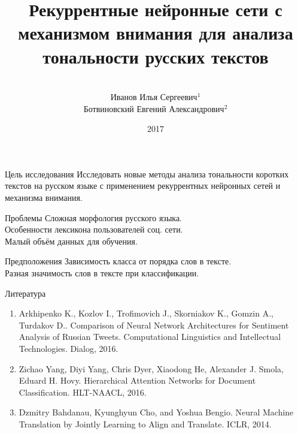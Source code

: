 \documentclass{beamer}
\title[\hbox to 56mm{\hfill\insertframenumber\,/\,\inserttotalframenumber}]
{Рекуррентные нейронные сети с механизмом внимания для анализа тональности русских текстов}
\author[И.\,С. Иванов]{\large \\Иванов Илья Сергеевич$^{1}$
{\large \\Ботвиновский Евгений Александрович$^{2}$}}
\institute{
$^{1}$студент, Московский Физико-Технический Институт\\
$^{2}$к.ф.-м.н., DeepHackLab\\
}
\date{2017}
\begin{document}
\nocite{*}
\begin{frame}
\titlepage
\end{frame}
\begin{frame}{Цель исследования}
Исследовать новые методы анализа тональности коротких текстов на русском языке с применением рекуррентных нейронных сетей и механизма внимания.
\begin{block}{Проблемы}
	Сложная морфология русского языка.\\
	Особенности лексикона пользователей соц. сети.\\
	Малый объём данных для обучения.\\
\end{block}

\begin{block}{Предположения}
	Зависимость класса от порядка слов в тексте.\\
	Разная значимость слов в тексте при классификации.
\end{block}

\end{frame}
\begin{frame}{Литература}
	\begin{enumerate}
		\item Arkhipenko K., Kozlov I., Trofimovich J., Skorniakov K., Gomzin A., Turdakov D.. Comparison of Neural Network Architectures for Sentiment Analysis of Russian Tweets. Computational Linguistics and Intellectual Technologies. Dialog, 2016.	
		\item Zichao Yang, Diyi Yang, Chris Dyer, Xiaodong He, Alexander J. Smola, Eduard H. Hovy. Hierarchical Attention Networks for Document Classification. HLT-NAACL, 2016.
		\item Dzmitry Bahdanau, Kyunghyun Cho, and Yoshua Bengio. Neural Machine Translation by Jointly Learning to Align and Translate. ICLR, 2014.
	\end{enumerate}
\end{frame}
\end{document}
